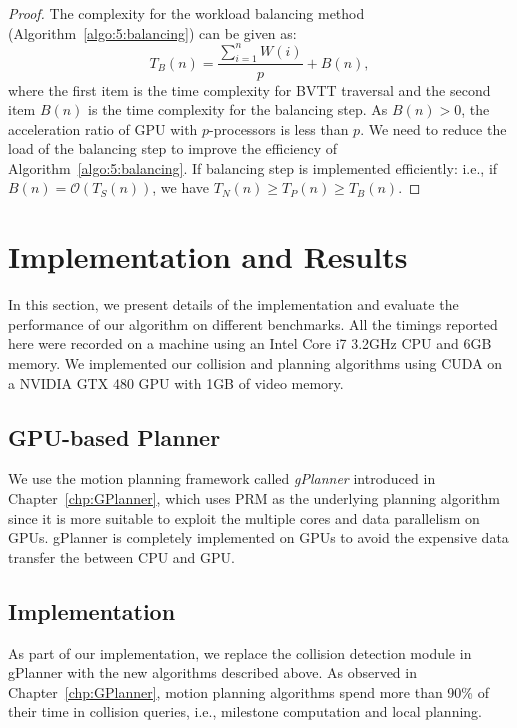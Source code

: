\begin{proof}
The complexity for the workload balancing method (Algorithm~\ref{algo:5:balancing}) can be given as: $$T_B(n) = \frac{\sum_{i=1}^n W(i)}{p} + B(n),$$ where the first item is the time complexity for BVTT traversal and the second item $B(n)$ is the time complexity for the balancing step. As $B(n) > 0$, the acceleration ratio of GPU with $p$-processors is less than $p$. We need to reduce the load of the balancing step to improve the efficiency of Algorithm~\ref{algo:5:balancing}. If balancing step is implemented efficiently: i.e., if $B(n) = \mathcal O (T_S(n))$, we have $T_N(n) \geq T_P(n) \geq T_B(n)$.
\end{proof}



\section{Implementation and Results}
\label{sec:5:result}


In this section, we present details of the implementation and evaluate the performance of our algorithm
on different benchmarks. All the timings reported here were recorded on a machine using an Intel Core i7 3.2GHz CPU and 6GB
memory. We implemented our collision and planning algorithms using CUDA on a NVIDIA GTX 480 GPU with 1GB of video memory.

\subsection{GPU-based Planner}
We use the motion planning framework called \emph{gPlanner} introduced in Chapter~\ref{chp:GPlanner}, which uses PRM
as the underlying planning algorithm since it is more suitable to exploit the multiple cores and data parallelism on GPUs. gPlanner is completely implemented on GPUs to avoid the expensive data transfer the between CPU and GPU.


\subsection{Implementation}
As part of our implementation, we replace the collision detection module in gPlanner with the new algorithms described above.
As observed in Chapter~\ref{chp:GPlanner}, motion planning algorithms spend more than 
90\% of their time in collision queries, i.e., milestone computation and local planning.

